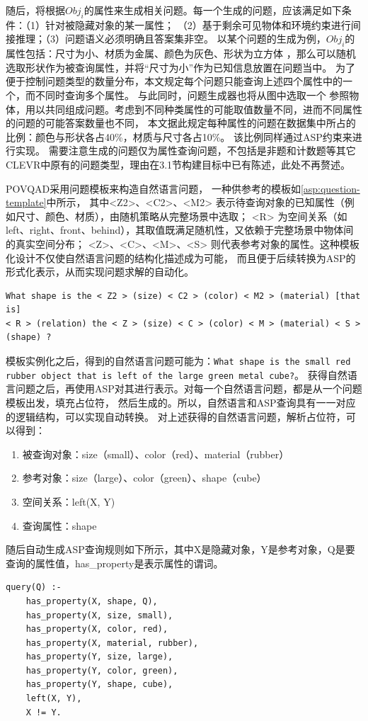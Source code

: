 随后，将根据$Obj_i$的属性来生成相关问题。每一个生成的问题，应该满足如下条件：（1）针对被隐藏对象的某一属性；
（2）基于剩余可见物体和环境约束进行间接推理；（3）问题语义必须明确且答案集非空。
以某个问题的生成为例，$Obj_i$的属性包括：尺寸为小、材质为金属、颜色为灰色、形状为立方体
，那么可以随机选取形状作为被查询属性，并将“尺寸为小”作为已知信息放置在问题当中。
为了便于控制问题类型的数量分布，本文规定每个问题只能查询上述四个属性中的一个，而不同时查询多个属性。
与此同时，问题生成器也将从图中选取一个
参照物体，用以共同组成问题。考虑到不同种类属性的可能取值数量不同，进而不同属性的问题的可能答案数量也不同，
本文据此规定每种属性的问题在数据集中所占的比例：颜色与形状各占40\%，材质与尺寸各占10\%。
该比例同样通过ASP约束来进行实现。
需要注意生成的问题仅为属性查询问题，不包括是非题和计数题等其它CLEVR中原有的问题类型，理由在3.1节构建目标中已有陈述，此处不再赘述。

POVQAD采用问题模板来构造自然语言问题，
一种供参考的模板如\ref{asp:question-template}中所示，
其中<Z2>、<C2>、<M2> 表示待查询对象的已知属性（例如尺寸、颜色、材质），由随机策略从完整场景中选取；
<R> 为空间关系（如left、right、front、behind），其取值既满足随机性，又依赖于完整场景中物体间的真实空间分布；
<Z>、<C>、<M>、<S> 则代表参考对象的属性。这种模板化设计不仅使自然语言问题的结构化描述成为可能，
而且便于后续转换为ASP的形式化表示，从而实现问题求解的自动化。
\begin{lstlisting}[label=asp:question-template]
What shape is the < Z2 > (size) < C2 > (color) < M2 > (material) [that is] 
< R > (relation) the < Z > (size) < C > (color) < M > (material) < S > (shape) ?
\end{lstlisting}

模板实例化之后，得到的自然语言问题可能为：\texttt{What shape is the small red rubber object that is left of the large green metal cube?}。
获得自然语言问题之后，再使用ASP对其进行表示。对每一个自然语言问题，都是从一个问题模板出发，填充占位符，
然后生成的。所以，自然语言和ASP查询具有一一对应的逻辑结构，可以实现自动转换。
对上述获得的自然语言问题，解析占位符，可以得到：
\begin{enumerate}[nosep]
\item 被查询对象：size（small）、color（red）、material（rubber）
\item 参考对象：size（large）、color（green）、shape（cube）
\item 空间关系：left(X, Y)
\item 查询属性：shape
\end{enumerate}

随后自动生成ASP查询规则如下所示，其中X是隐藏对象，Y是参考对象，Q是要查询的属性值，has\_property是表示属性的谓词。
\begin{lstlisting}
query(Q) :-
    has_property(X, shape, Q),
    has_property(X, size, small),
    has_property(X, color, red),
    has_property(X, material, rubber),
    has_property(Y, size, large),
    has_property(Y, color, green),
    has_property(Y, shape, cube),
    left(X, Y),
    X != Y.
\end{lstlisting}
